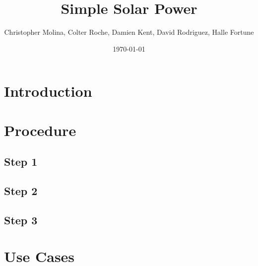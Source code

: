 \documentclass{report}
\begin{document}
\title{Simple Solar Power}
\author{Christopher Molina, Colter Roche, Damien Kent, David Rodriguez, Halle Fortune}
\date{\today}
\maketitle

\tableofcontents
\newpage
{}

\section{Introduction}

\section{Procedure}
    \subsection{Step 1}
    \subsection{Step 2}
    \subsection{Step 3}

\section{Use Cases}
\end{document}
